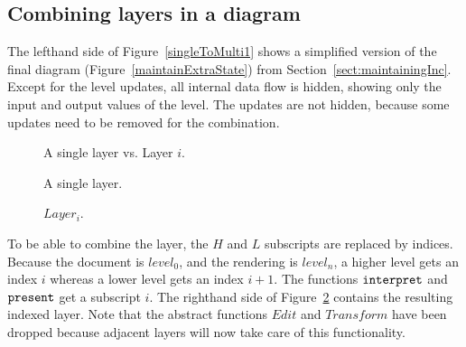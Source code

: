 \subsection{Combining layers in a diagram}

\bc The lefthand side of \ec Figure~\ref{singleToMulti1} shows a simplified version of the final diagram (Figure~\ref{maintainExtraState}) from Section~\ref{sect:maintainingInc}. Except for the level updates, all internal data flow is hidden, showing only the input and output values of the level. The updates are not hidden, because some updates need to be removed for the combination.




\bc
\begin{figure}\begin{small}\begin{center}\begin{center}
\end{center}
\caption{A single layer vs. Layer $i$.}\label{singleToMulti} 
\end{center}\end{small}\end{figure}
\ec
\begin{figure}[h]
  \hfill
  \begin{minipage}[b]{.45\textwidth}
    \begin{center}  
      \caption{A single layer.} \label{singleToMulti1}
    \end{center}
  \end{minipage}
  \hfill
  \begin{minipage}[b]{.45\textwidth}
    \begin{center}  
      \hfill
      \caption{$Layer_i$.} \label{singleToMulti2}
    \end{center}
  \end{minipage}
  \hfill
\end{figure}

To be able to combine the layer, the $H$ and $L$ subscripts are replaced by indices. Because the document is $level_0$, and the rendering is $level_n$, a higher level gets an index $i$ whereas a lower level gets an index $i+1$. The functions ${\tt interpret}$ and ${\tt present}$ get a subscript $i$. \bc The righthand side of \ec Figure~\ref{singleToMulti2} contains the resulting indexed layer. Note that the abstract functions $Edit$ and $Transform$ have been dropped because adjacent layers will now take care of this functionality.


